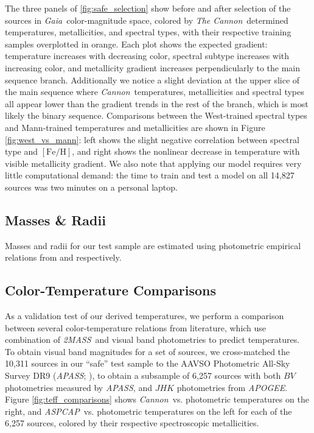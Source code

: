 \documentclass[modern]{aastex62}
\newcommand{\apogee}{\textsl{APOGEE}}
\newcommand{\thecannon}{\textsl{The Cannon}}
\newcommand{\cannon}{\textsl{Cannon}}
\newcommand{\aspcap}{\textsl{ASPCAP}}
\newcommand{\gaia}{\textsl{Gaia}}
\newcommand{\zmass}{\textsl{2MASS}}
\newcommand{\feh}{[{\mathrm{Fe}/\mathrm{H}}]}
\begin{document}
The three panels of \ref{fig:safe_selection} show before and after selection of the sources in \gaia\ color-magnitude space, colored by \thecannon\ determined temperatures, metallicities, and spectral types, with their respective training samples overplotted in orange. Each plot shows the expected gradient: temperature increases with decreasing color, spectral subtype increases with increasing color, and metallicity gradient increases perpendicularly to the main sequence branch. Additionally we notice a slight deviation at the upper slice of the main sequence where \cannon\ temperatures, metallicities and spectral types all appear lower than the gradient trends in the rest of the branch, which is most likely the binary sequence. Comparisons between the West-trained spectral types and Mann-trained temperatures and metallicities are shown in Figure \ref{fig:west_vs_mann}: left shows the slight negative correlation between spectral type and $\feh$, and right shows the nonlinear decrease in temperature with visible metallicity gradient. We also note that applying our model requires very little computational demand: the time to train and test a model on all 14,827 sources was two minutes on a personal laptop. 


\subsection{Masses \& Radii}
Masses and radii for our test sample are estimated using photometric empirical relations from \citealt{Mann:2019} and \citealt{Mann:2015} respectively. 


\subsection{Color-Temperature Comparisons}

As a validation test of our derived temperatures, we perform a comparison between several color-temperature relations from literature, which use combination of \zmass\ and visual band photometries to predict temperatures. To obtain visual band magnitudes for a set of sources, we cross-matched the 10,311 sources in our ``safe'' test sample to the AAVSO Photometric All-Sky Survey DR9 (\textsl{APASS}; \citealt{Henden:2016}), to obtain a subsample of 6,257 sources with both $BV$ photometries measured by \textsl{APASS}, and $JHK$ photometries from \apogee. Figure \ref{fig:teff_comparisons} shows \cannon\ vs. photometric temperatures on the right, and \aspcap\ vs. photometric temperatures on the left for each of the 6,257 sources, colored by their respective spectroscopic metallicities.
\end{document}
